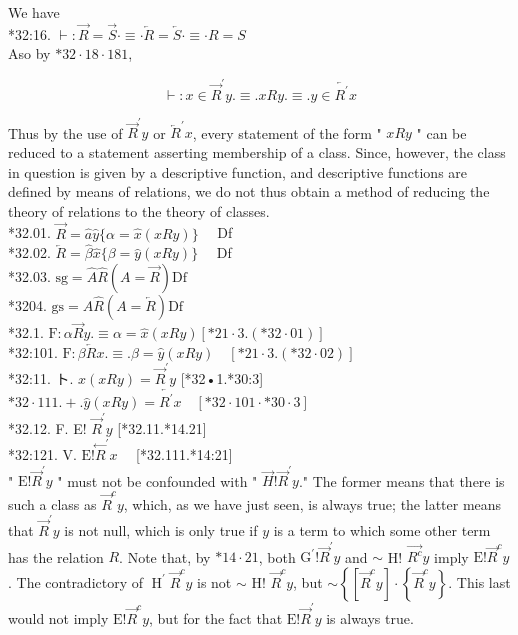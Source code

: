\documentclass[10pt]{article}
\begin{document}
We have\\
*32:16. $\vdash: \vec{R}=\vec{S} \cdot \equiv \cdot \overleftarrow{R}=\overleftarrow{S} \cdot \equiv \cdot R=S$\\
Aso by $* 32 \cdot 18 \cdot 181$,

$$
\vdash: x \in \vec{R}^{\prime} y . \equiv . x R y . \equiv . y \in \overleftarrow{R^{\prime}} x
$$

Thus by the use of $\vec{R}^{\prime} y$ or $\overleftarrow{R}^{\prime} x$, every statement of the form " $x R y$ " can be reduced to a statement asserting membership of a class. Since, however, the class in question is given by a descriptive function, and descriptive functions are defined by means of relations, we do not thus obtain a method of reducing the theory of relations to the theory of classes.\\
*32.01. $\vec{R}=\hat{a} \hat{y}\{\alpha=\hat{x}(x R y)\} \quad$ Df\\
*32.02. $\overleftarrow{R}=\hat{\beta} \hat{x}\{\beta=\hat{y}(x R y)\} \quad$ Df\\
*32.03. $\mathrm{sg}=\hat{A} \hat{R}(A=\vec{R}) \mathrm{Df}$\\
*3204. $\mathrm{gs}=\hat{A} \hat{R}(A=\overleftarrow{R}) \mathrm{Df}$\\
*32.1. $\mathrm{F}: \alpha \vec{R} y . \equiv \alpha=\hat{x}(x R y)[* 21 \cdot 3 .(* 32 \cdot 01)]$\\
*32:101. $\mathrm{F}: \beta \overleftarrow{R} x . \equiv . \beta=\hat{y}(x R y) \quad[* 21 \cdot 3 .(* 32 \cdot 02)]$\\
*32:11. ト. $\hat{x}(x R y)=\vec{R}^{\prime} y$ [*32•1.*30:3]\\
$* 32 \cdot 111 .+. \hat{y}(x R y)=\overleftarrow{R^{\prime}} x \quad[* 32 \cdot 101 \cdot * 30 \cdot 3]$\\
*32.12. F. E! $\vec{R}^{\prime} y$ [*32.11.*14.21]\\
*32:121. V. $\mathrm{E}!\stackrel{\leftarrow}{R}^{\prime} x \quad$ [*32.111.*14:21]\\
" $\mathrm{E}!\vec{R}^{\prime} y$ " must not be confounded with " $\vec{H}!\vec{R}^{\prime} y$." The former means that there is such a class as $\vec{R}^{c} y$, which, as we have just seen, is always true; the latter means that $\vec{R}^{\prime} y$ is not null, which is only true if $y$ is a term to which some other term has the relation $R$. Note that, by $* 14 \cdot 21$, both $\mathrm{G}^{\prime}!\vec{R}^{\prime} y$ and $\sim$ H! $\overrightarrow{R^{c}} y$ imply $\mathrm{E}!\vec{R}^{c} y$. The contradictory of $\operatorname{H}^{\prime} \vec{R}^{c} y$ is not $\sim$ H! $\vec{R}^{c} y$, but $\sim\left\{\left[\vec{R}^{c} y\right] \cdot\left\{\vec{R}^{c} y\right\}\right.$. This last would not imply $\mathrm{E}!\vec{R}^{c} y$, but for the fact that $\mathrm{E}!\vec{R}^{\prime} y$ is always true.\\
\end{document}
